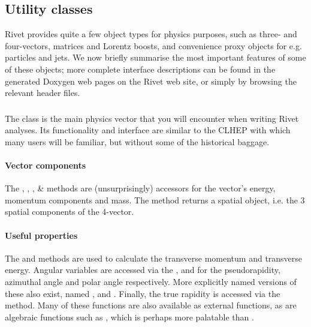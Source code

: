 

\subsection{Utility classes}

Rivet provides quite a few object types for physics purposes, such as three- and
four-vectors, matrices and Lorentz boosts, and convenience proxy objects for
e.g. particles and jets. We now briefly summarise the most important features of
some of these objects; more complete interface descriptions can be found in the
generated Doxygen web pages on the Rivet web site, or simply by browsing the
relevant header files.

\subsubsection{}

The  class is the main physics vector that you will encounter
when writing Rivet analyses. Its functionality and interface are similar to the
CLHEP  with which many users will be familiar, but
without some of the historical baggage.

\paragraph{Vector components}%
The  , , ,  \&
 methods are (unsurprisingly) accessors for the vector's energy,
momentum components and mass. The  method returns a spatial
 object, i.e. the 3 spatial components of the 4-vector.

\paragraph{Useful properties}%
The  and  methods are used to calculate the transverse
momentum and transverse energy. Angular variables are accessed via the
,  and  for the pseudorapidity, azimuthal
angle and polar angle respectively. More explicitly named versions of these also
exist, named ,  and
. Finally, the true rapidity is accessed via the
 method. Many of these functions are also available as external
functions, as are algebraic functions such as , which
is perhaps more palatable than .

